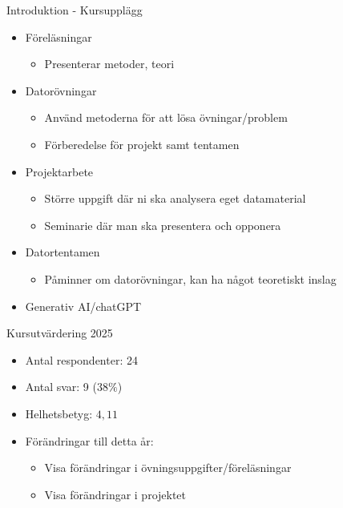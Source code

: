 \documentclass[10pt,english]{beamer}
\begin{document}
\begin{frame}{Introduktion - Kursupplägg}
    \begin{itemize}
        \item Föreläsningar
        \begin{itemize}
            \item Presenterar metoder, teori
        \end{itemize}
        \item Datorövningar
        \begin{itemize}
            \item Använd metoderna för att lösa övningar/problem
            \item Förberedelse för projekt samt tentamen
        \end{itemize}
        \item Projektarbete
        \begin{itemize}
            \item Större uppgift där ni ska analysera eget datamaterial
            \item Seminarie där man ska presentera och opponera
        \end{itemize}
        \item Datortentamen
        \begin{itemize}
            \item Påminner om datorövningar, kan ha något teoretiskt inslag
        \end{itemize}
        \item Generativ AI/chatGPT
    \end{itemize}
    
\end{frame}

\begin{frame}{Kursutvärdering 2025}
    \begin{itemize}
        \item Antal respondenter: 24
        \item Antal svar: 9 ($38\%$)
        \item Helhetsbetyg: $4,11$
        \item Förändringar till detta år:
        \begin{itemize}
            \item Visa förändringar i övningsuppgifter/föreläsningar
            \item Visa förändringar i projektet
        \end{itemize}
    \end{itemize}
\end{frame}
\end{document}
